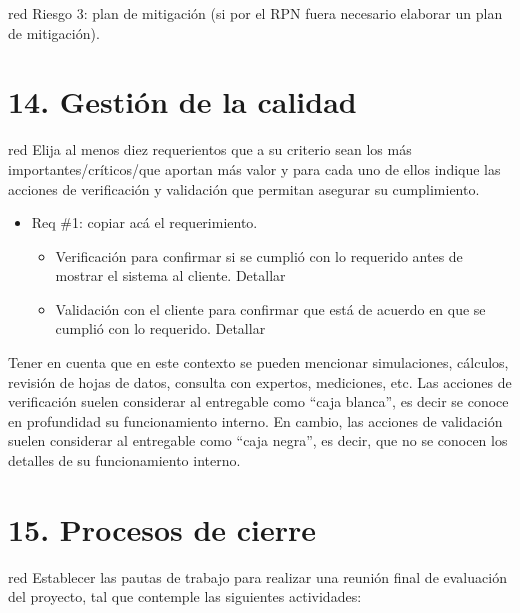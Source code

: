 \documentclass[
11pt, %
]{charter}
\begin{document}
{\begin{consigna}{red}
Riesgo 3: plan de mitigación (si por el RPN fuera necesario elaborar un plan de mitigación).

\end{consigna}


\section{14. Gestión de la calidad}
\label{sec:calidad}

\begin{consigna}{red}
Elija al menos diez requerientos que a su criterio sean los más importantes/críticos/que aportan más valor y para cada uno de ellos indique las acciones de verificación y validación que permitan asegurar su cumplimiento.

\begin{itemize} 
\item Req \#1: copiar acá el requerimiento.

\begin{itemize}
	\item Verificación para confirmar si se cumplió con lo requerido antes de mostrar el sistema al cliente. Detallar 
	\item Validación con el cliente para confirmar que está de acuerdo en que se cumplió con lo requerido. Detallar  
\end{itemize}

\end{itemize}

Tener en cuenta que en este contexto se pueden mencionar simulaciones, cálculos, revisión de hojas de datos, consulta con expertos, mediciones, etc.  Las acciones de verificación suelen considerar al entregable como ``caja blanca'', es decir se conoce en profundidad su funcionamiento interno.  En cambio, las acciones de validación suelen considerar al entregable como ``caja negra'', es decir, que no se conocen los detalles de su funcionamiento interno.

\end{consigna}

\section{15. Procesos de cierre}    
\label{sec:cierre}

\begin{consigna}{red}
Establecer las pautas de trabajo para realizar una reunión final de evaluación del proyecto, tal que contemple las siguientes actividades:


\end{consigna}}
\end{document}
